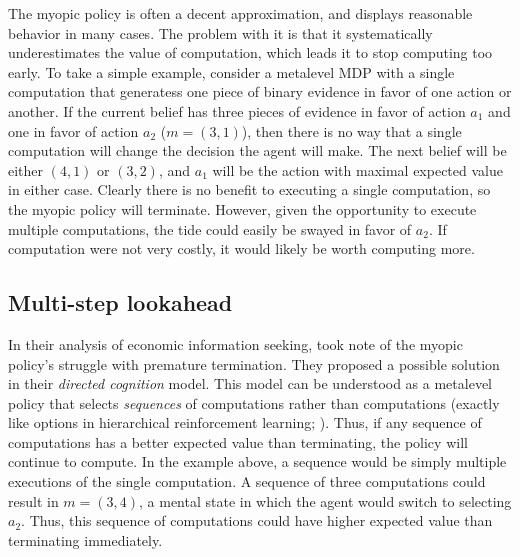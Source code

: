 The myopic policy is often a decent approximation, and displays reasonable behavior in many cases. The problem with it is that it systematically underestimates the value of computation, which leads it to stop computing too early. To take a simple example, consider a metalevel MDP with a single computation that generatess one piece of binary evidence in favor of one action or another. If the current belief has three pieces of evidence in favor of action $a_1$ and one in favor of action $a_2$ ($m = (3, 1)$), then there is no way that a single computation will change the decision the agent will make. The next belief will be either $(4, 1)$ or $(3, 2)$, and $a_1$ will be the action with maximal expected value in either case. Clearly there is no benefit to executing a single computation, so the myopic policy will terminate. However, given the opportunity to execute multiple computations, the tide could easily be swayed in favor of $a_2$. If computation were not very costly, it would likely be worth computing more. 


\subsection{Multi-step lookahead}

In their analysis of economic information seeking, \citet{gabaix2005bounded} took note of the myopic policy's struggle with premature termination. They proposed a possible solution in their \emph{directed cognition} model. This model can be understood as a metalevel policy that selects \emph{sequences} of computations rather than computations (exactly like options in hierarchical reinforcement learning; \citealp{sutton1999mdps}). Thus, if any sequence of computations has a better expected value than terminating, the policy will continue to compute. In the example above, a sequence would be simply multiple executions of the single computation. A sequence of three computations could result in $m=(3,4)$, a mental state in which the agent would switch to selecting $a_2$. Thus, this sequence of computations could have higher expected value than terminating immediately.

